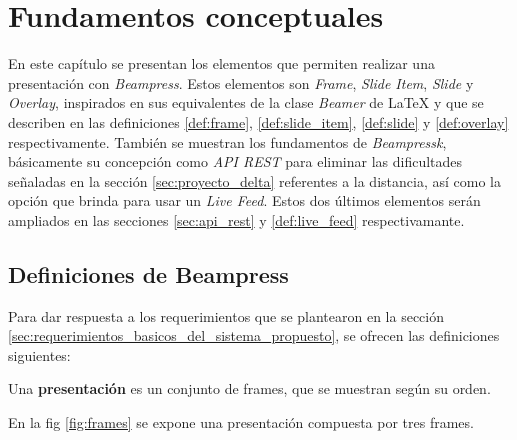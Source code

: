 
\chapter{Fundamentos conceptuales} %
\label{cha:fundamentos_conceptuales}
	En este capítulo se presentan los elementos que permiten realizar una presentación con \textit{Beampress}. Estos elementos son \textit{Frame}, \textit{Slide Item}, \textit{Slide} y \textit{Overlay}, inspirados en sus equivalentes de la clase \textit{Beamer} de \LaTeX{} y que se describen en las definiciones \ref{def:frame}, \ref{def:slide_item}, \ref{def:slide} y \ref{def:overlay} respectivamente. También se muestran los fundamentos de \textit{Beampressk}, básicamente su concepción como \textit{API REST} para eliminar las dificultades señaladas en la sección \ref{sec:proyecto_delta} referentes a la distancia, así como la opción que brinda para usar un \textit{Live Feed}. Estos dos últimos elementos serán ampliados en las secciones \ref{sec:api_rest} y \ref{def:live_feed} respectivamante. 

	\section{Definiciones de Beampress} %
	\label{sec:definiciones_de_beampress}
		Para dar respuesta a los requerimientos que se plantearon en la sección \ref{sec:requerimientos_basicos_del_sistema_propuesto}, se ofrecen las definiciones siguientes:

		
 		\begin{definition}
 		\label{def:presentation}
			Una \textbf{presentación} es un conjunto de frames, que se muestran según su orden.
 		\end{definition}

 		En la fig \ref{fig:frames} se expone una presentación compuesta por tres frames.

